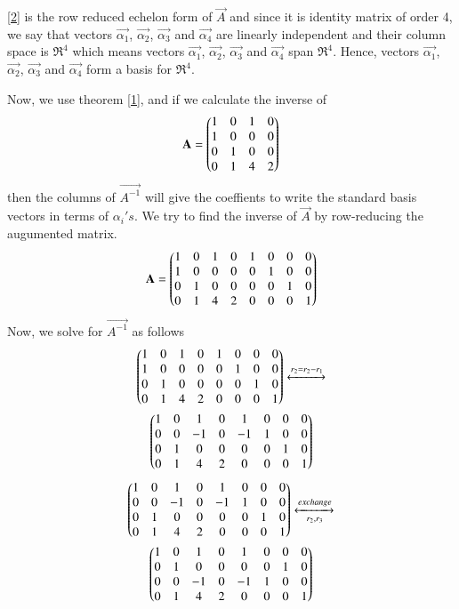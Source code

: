 \documentclass[journal,12pt,twocolumn]{IEEEtran}
\begin{document}
\eqref{2} is the row reduced echelon form of $\vec{A}$ and since it is identity matrix of order 4, we say that vectors $\vec{\alpha_1}$, $\vec{\alpha_2}$, $\vec{\alpha_3}$ and $\vec{\alpha_4}$ are linearly independent and their column space is $\Re^4$ which means vectors $\vec{\alpha_1}$, $\vec{\alpha_2}$, $\vec{\alpha_3}$ and $\vec{\alpha_4}$ span $\Re^4$.
Hence, vectors $\vec{\alpha_1}$, $\vec{\alpha_2}$, $\vec{\alpha_3}$ and $\vec{\alpha_4}$ form a basis for $\Re^4$. 

Now, we use theorem \eqref{1}, and if we calculate the inverse of 
\begin{align}
	\mathbf{A} = \begin{pmatrix}1 & 0 & 1 & 0 \\ 1 & 0 & 0 & 0 \\ 0 & 1 & 0 & 0 \\ 0 & 1 & 4 & 2\end{pmatrix}
\end{align}
then the columns of $\vec{A^{-1}}$ will give the coeffients to write the standard basis vectors in terms of $\alpha_i's$. We try to find the inverse of $\vec{A}$ by row-reducing the augumented matrix. 
\begin{align}
	\mathbf{A} = \begin{pmatrix}1 & 0 & 1 & 0& 1 &0 &0 & 0 \\ 1 & 0 & 0 & 0& 0&1 &0&0 \\ 0 & 1 & 0 & 0& 0 &0 &1 &0 \\ 0 & 1 & 4 & 2& 0 & 0& 0 &1\end{pmatrix}
\end{align}
Now, we solve for $\vec{A^{-1}}$ as follows 
\begin{multline}
 \begin{pmatrix}1 & 0 & 1 & 0& 1 &0 &0 & 0 \\ 1 & 0 & 0 & 0& 0&1 &0&0 \\ 0 & 1 & 0 & 0& 0 &0 &1 &0 \\ 0 & 1 & 4 & 2& 0 & 0& 0 &1\end{pmatrix} \xleftrightarrow[]{r_2=r_2-r_1} \\ \begin{pmatrix}1 & 0 & 1 & 0& 1 &0 &0 & 0 \\ 0 & 0 & -1 & 0& -1&1 &0&0 \\ 0 & 1 & 0 & 0& 0 &0 &1 &0 \\ 0 & 1 & 4 & 2& 0 & 0& 0 &1\end{pmatrix}
\end{multline}
\begin{multline}
\begin{pmatrix}1 & 0 & 1 & 0& 1 &0 &0 & 0 \\ 0 & 0 & -1 & 0& -1&1 &0&0 \\ 0 & 1 & 0 & 0& 0 &0 &1 &0 \\ 0 & 1 & 4 & 2& 0 & 0& 0 &1\end{pmatrix}\xleftrightarrow[r_2,r_3]{exchange} \\ \begin{pmatrix}1 & 0 & 1 & 0& 1 &0 &0 & 0 \\0 & 1 & 0 & 0& 0 &0 &1 &0 \\ 0 & 0 & -1 & 0& -1&1 &0&0  \\ 0 & 1 & 4 & 2& 0 & 0& 0 &1\end{pmatrix}
\end{multline}
\end{document}
